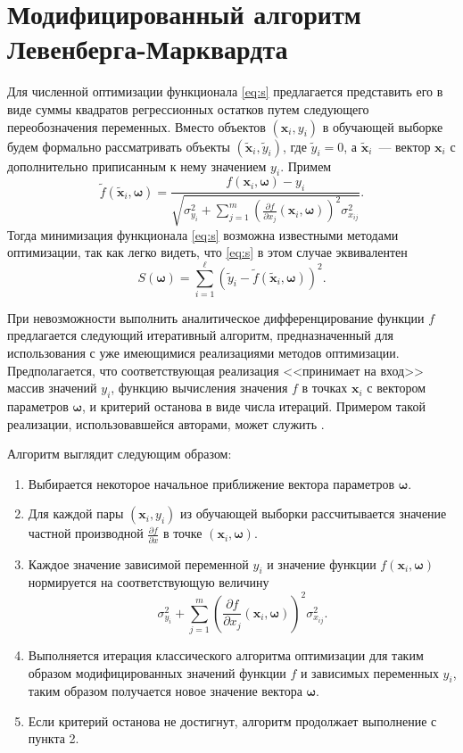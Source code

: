 \documentclass[11pt,a4paper]{article}
\newcommand{\bomega}{\boldsymbol{\omega}}
\begin{document}
\section{Модифицированный алгоритм Левенберга-Марквардта}

Для численной оптимизации функционала \eqref{eq:s} предлагается представить его в виде
суммы квадратов регрессионных остатков путем следующего переобозначения переменных.
Вместо объектов $(\mathbf{x}_i, y_i)$ в обучающей выборке будем формально рассматривать
объекты $(\tilde{\mathbf{x}}_i, \tilde{y}_i)$, где $\tilde{y}_i = 0$, а
$\tilde{\mathbf{x}}_i$~--- вектор $\mathbf{x}_i$ с дополнительно приписанным к нему
значением $y_i$. Примем
\[
  \tilde{f}(\tilde{\mathbf{x}}_i, \bomega) = \frac{f(\mathbf{x}_i, \bomega) - y_i}{\sqrt{\sigma_{y_i}^2 + \sum_{j = 1}^m (\frac{\partial f}{\partial x_j}(\mathbf{x}_i, \bomega))^2 \sigma^2_{x_{ij}}}}.
\]
Тогда минимизация функционала \eqref{eq:s} возможна известными методами оптимизации, так
как легко видеть, что \eqref{eq:s} в этом случае эквивалентен
\[
  S(\bomega) = \sum_{i = 1}^\ell (\tilde{y}_i - \tilde{f}(\tilde{\mathbf{x}}_i, \bomega))^2.
\]

При невозможности выполнить аналитическое дифференцирование функции $f$ предлагается
следующий итеративный алгоритм, предназначенный для использования с уже имеющимися
реализациями методов оптимизации. Предполагается, что соответствующая реализация
<<принимает на вход>> массив значений $y_i$,
функцию вычисления значения $f$ в точках $\mathbf{x}_i$ с вектором параметров $\bomega$,
и критерий останова в виде числа итераций. Примером такой реализации, использовавшейся
авторами, может служить \cite{dlib09}.

Алгоритм выглядит следующим образом:
\begin{enumerate}
  \item Выбирается некоторое начальное приближение вектора параметров $\bomega$.
  \item Для каждой пары $(\mathbf{x}_i, y_i)$ из обучающей выборки рассчитывается значение
	частной производной $\frac{\partial f}{\partial x}$ в точке $(\mathbf{x}_i, \bomega)$.
  \item Каждое значение зависимой переменной $y_i$ и значение функции $f(\mathbf{x}_i, \bomega)$
	нормируется на соответствующую величину
	\[
	  \sigma_{y_i}^2 + \sum_{j = 1}^m (\frac{\partial f}{\partial x_j}(\mathbf{x}_i, \bomega))^2 \sigma^2_{x_{ij}}.
	\]
  \item Выполняется итерация классического алгоритма оптимизации для таким образом
	модифицированных значений функции $f$ и зависимых переменных $y_i$, таким образом
	получается новое значение вектора $\bomega$.
  \item Если критерий останова не достигнут, алгоритм продолжает выполнение с пункта 2.
\end{enumerate}
\end{document}
